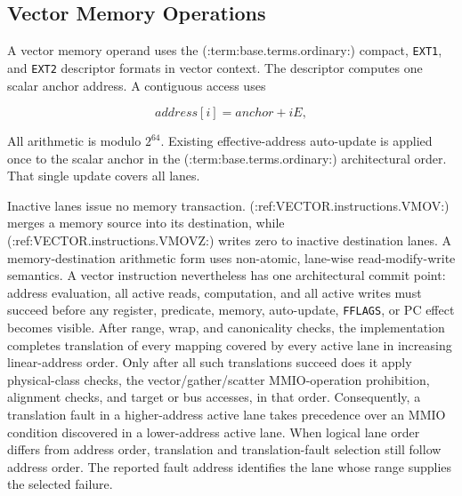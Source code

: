 \subsection{Vector Memory Operations}

A vector memory operand uses the (:term:base.terms.ordinary:) compact, \texttt{EXT1}, and
\texttt{EXT2} descriptor formats in vector context.  The descriptor computes
one scalar anchor address.  A contiguous access uses

\[
  address[i] = anchor + iE,
\]

All arithmetic is modulo $2^{64}$. Existing effective-address auto-update is
applied once to the scalar anchor in the (:term:base.terms.ordinary:) architectural order. That
single update covers all lanes.

Inactive lanes issue no memory transaction.  (:ref:VECTOR.instructions.VMOV:) merges a memory
source into its destination, while (:ref:VECTOR.instructions.VMOVZ:) writes zero to inactive
destination lanes. A memory-destination arithmetic form uses non-atomic,
lane-wise read-modify-write semantics. A vector instruction nevertheless
has one architectural commit point: address evaluation, all active reads,
computation, and all active writes must succeed before any register,
predicate, memory, auto-update, \texttt{FFLAGS}, or PC effect becomes visible.
After range, wrap, and canonicality checks, the implementation completes
translation of every mapping covered by every active lane in increasing
linear-address order.  Only after all such translations succeed does it apply
physical-class checks, the vector/gather/scatter MMIO-operation prohibition,
alignment checks, and target or bus accesses, in that order.  Consequently, a
translation fault in a higher-address active lane takes precedence over an
MMIO condition discovered in a lower-address active lane.  When logical lane
order differs from address order, translation and translation-fault selection
still follow address order.  The reported fault address identifies the lane
whose range supplies the selected failure.
